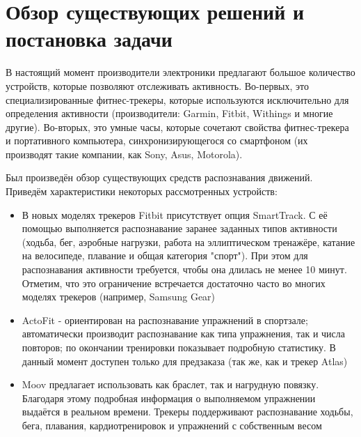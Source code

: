 \chapter{Обзор существующих решений и постановка задачи}

В настоящий момент производители электроники предлагают большое количество устройств, которые позволяют отслеживать активность. Во-первых, это специализированные фитнес-трекеры, которые используются исключительно для определения активности (производители: Garmin, Fitbit, Withings и многие другие). Во-вторых, это умные часы, которые сочетают свойства фитнес-трекера и портативного компьютера, синхронизирующегося со смартфоном (их производят такие компании, как Sony, Asus, Motorola). 

Был произведён обзор существующих средств распознавания движений. Приведём характеристики некоторых рассмотренных устройств: 

\begin{itemize}
\item В новых моделях трекеров Fitbit присутствует опция SmartTrack. С её помощью выполняется распознавание заранее заданных типов активности (ходьба, бег, аэробные нагрузки, работа на эллиптическом тренажёре, катание на велосипеде, плавание и общая категория "спорт"). При этом для распознавания активности требуется, чтобы она длилась не менее 10 минут. Отметим, что это ограничение встречается достаточно часто во многих моделях трекеров (например, Samsung Gear)
\item ActoFit - ориентирован на распознавание упражнений в спортзале; автоматически производит распознавание как типа упражнения, так и числа повторов; по окончании тренировки показывает подробную статистику. В данный момент доступен только для предзаказа (так же, как и трекер Atlas)
\item Moov предлагает использовать как браслет, так и нагрудную повязку. Благодаря этому подробная информация о выполняемом упражнении выдаётся в реальном времени. Трекеры поддерживают распознавание ходьбы, бега, плавания, кардиотренировок и упражнений с собственным весом
\end{itemize}

